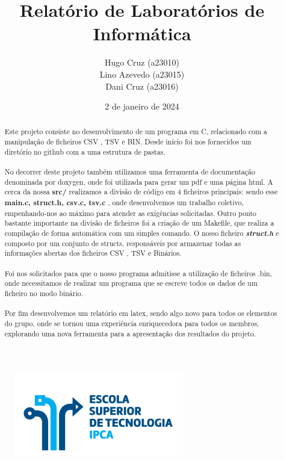 \documentclass[a4wide]{report}
\begin{document}
\begin{figure}
\centering
    \vspace{5 cm}
    \includegraphics[width=0.65\linewidth]{ipcatec.png}
\end{figure}
\title{Relatório de Laboratórios de Informática}
\author{Hugo Cruz (a23010)\\ 
Lino Azevedo (a23015)\\
Dani Cruz (a23016)}
\date{2 de janeiro de 2024}
\maketitle
\begin{abstract} %
Este projeto consiste no desenvolvimento de um programa em C, relacionado com a manipulação de ficheiros CSV , TSV e BIN. Desde início foi nos fornecidos um diretório no github com a uma estrutura de pastas. 
\\
\\
No decorrer deste projeto também utilizamos uma ferramenta de documentação denominada por doxygen, onde foi utilizada para gerar um pdf e uma página html. 
A cerca da nossa \textbf{src/} realizamos a divisão de código em 4 ficheiros principais: sendo esse \textbf{main.c, struct.h, csv.c, tsv.c }, onde desenvolvemos um trabalho coletivo, empenhando-nos  ao máximo para atender as exigências solicitadas. Outro ponto bastante importante na divisão de ficheiros foi a criação de um Makefile, que realiza a compilação de forma automática  com um simples comando. O nosso ficheiro \textit{\textbf{struct.h}} e composto por um conjunto de structs, 
responsáveis por armazenar todas as informações abertas dos ficheiros CSV , TSV e Binários. 
\\
\\
Foi nos solicitados para que o nosso programa admitisse a utilização de ficheiros .bin, onde necessitamos de realizar um programa que se escreve todos os dados de um ficheiro no modo binário.
\\
\\
Por fim desenvolvemos um relatório em latex, sendo algo novo para todos os elementos do grupo, onde se tornou uma experiência enriquecedora para todos os membros, explorando uma nova ferramenta para a apresentação dos resultados do projeto.
\end{abstract}
\tableofcontents
\listoffigures
\listoftables
\lstlistoflistings
\end{document}
